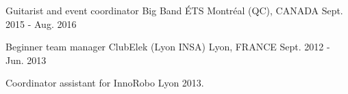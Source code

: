 


\begin{cventries}

\cventry
{Guitarist and event coordinator} %
{Big Band ÉTS} %
{\hspace{-5mm}Montréal (QC), CANADA} %
{Sept. 2015 - Aug. 2016} %
{ %
}

\cventry
{Beginner team manager} %
{ClubElek (Lyon INSA)} %
{Lyon, FRANCE} %
{Sept. 2012 - Jun. 2013} %
{ %
\begin{cvitems}
\item{Coordinator assistant for InnoRobo Lyon 2013.}
\end{cvitems}
}

\end{cventries}
